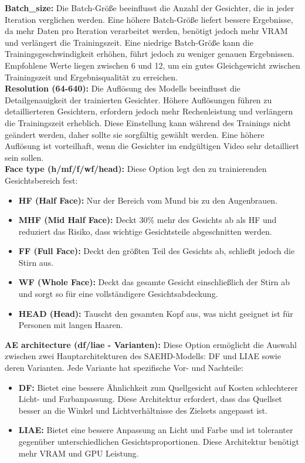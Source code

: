 \textbf{Batch\_size:} Die Batch-Größe beeinflusst die Anzahl der Gesichter, die in jeder Iteration verglichen werden.
Eine höhere Batch-Größe liefert bessere Ergebnisse, da mehr Daten pro Iteration verarbeitet werden, benötigt jedoch mehr VRAM und verlängert die Trainingszeit.
Eine niedrige Batch-Größe kann die Trainingsgeschwindigkeit erhöhen, führt jedoch zu weniger genauen Ergebnissen.
Empfohlene Werte liegen zwischen 6 und 12, um ein gutes Gleichgewicht zwischen Trainingszeit und Ergebnisqualität zu erreichen.\\

\textbf{Resolution (64-640):} Die Auflösung des Modells beeinflusst die Detailgenauigkeit der trainierten Gesichter.
Höhere Auflösungen führen zu detaillierteren Gesichtern, erfordern jedoch mehr Rechenleistung und verlängern die Trainingszeit erheblich.
Diese Einstellung kann während des Trainings nicht geändert werden, daher sollte sie sorgfältig gewählt werden.
Eine höhere Auflösung ist vorteilhaft, wenn die Gesichter im endgültigen Video sehr detailliert sein sollen.\\

\textbf{Face type (h/mf/f/wf/head):} Diese Option legt den zu trainierenden Gesichtsbereich fest:
\begin{itemize}
    \item \textbf{HF (Half Face):} Nur der Bereich vom Mund bis zu den Augenbrauen.
    \item \textbf{MHF (Mid Half Face):} Deckt 30\% mehr des Gesichts ab als HF und reduziert das Risiko, dass wichtige Gesichtsteile abgeschnitten werden.
    \item \textbf{FF (Full Face):} Deckt den größten Teil des Gesichts ab, schließt jedoch die Stirn aus.
    \item \textbf{WF (Whole Face):} Deckt das gesamte Gesicht einschließlich der Stirn ab und sorgt so für eine vollständigere Gesichtsabdeckung.
    \item \textbf{HEAD (Head):} Tauscht den gesamten Kopf aus, was nicht geeignet ist für Personen mit langen Haaren.
\end{itemize}

\textbf{AE architecture (df/liae - Varianten):} Diese Option ermöglicht die Auswahl zwischen zwei Hauptarchitekturen des SAEHD-Modells: DF und LIAE sowie deren Varianten.
Jede Variante hat spezifische Vor- und Nachteile:
\begin{itemize}
    \item \textbf{DF:} Bietet eine bessere Ähnlichkeit zum Quellgesicht auf Kosten schlechterer Licht- und Farbanpassung.
Diese Architektur erfordert, dass das Quellset besser an die Winkel und Lichtverhältnisse des Zielsets angepasst ist.
    \item \textbf{LIAE:} Bietet eine bessere Anpassung an Licht und Farbe und ist toleranter gegenüber unterschiedlichen Gesichtsproportionen.
Diese Architektur benötigt mehr VRAM und GPU Leistung.
\end{itemize}

